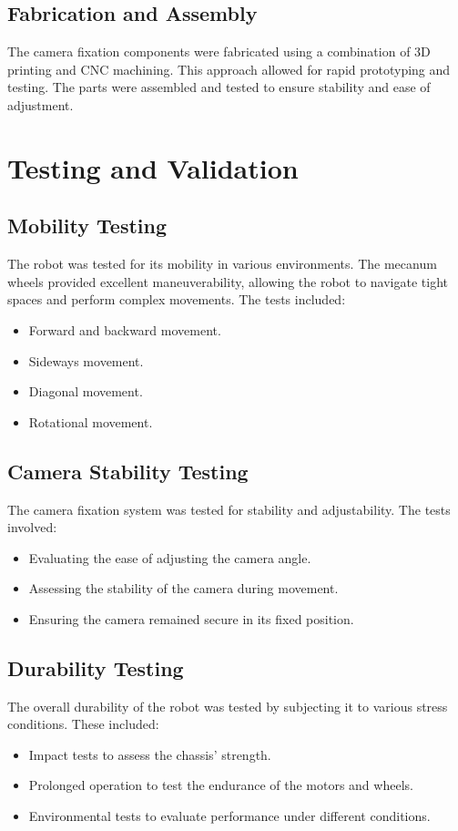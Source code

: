 \subsection{Fabrication and Assembly}
The camera fixation components were fabricated using a combination of 3D printing and CNC
machining. This approach allowed for rapid prototyping and testing. The parts were assembled and
tested to ensure stability and ease of adjustment.
\section{Testing and Validation}
\subsection{Mobility Testing}
The robot was tested for its mobility in various environments. The mecanum wheels provided
excellent maneuverability, allowing the robot to navigate tight spaces and perform complex
movements. The tests included:
\begin{itemize}
	\item Forward and backward movement.
	\item Sideways movement.
	\item Diagonal movement.
	\item Rotational movement.
\end{itemize}


\subsection{Camera Stability Testing}
The camera fixation system was tested for stability and adjustability. The tests involved:
\begin{itemize}
	\item Evaluating the ease of adjusting the camera angle.
	\item Assessing the stability of the camera during movement.
	\item Ensuring the camera remained secure in its fixed position.
\end{itemize}


\subsection{Durability Testing}
The overall durability of the robot was tested by subjecting it to various stress conditions. These
included:
\begin{itemize}
	\item Impact tests to assess the chassis’ strength.
	\item Prolonged operation to test the endurance of the motors and wheels.
	\item Environmental tests to evaluate performance under different conditions.
\end{itemize}


